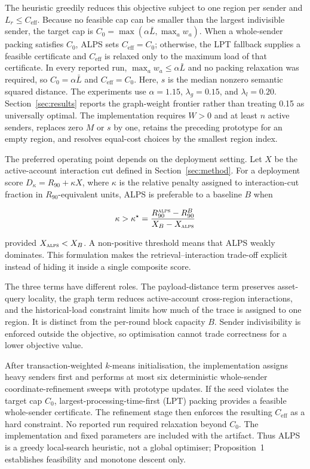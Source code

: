 \documentclass[runningheads]{llncs}
\begin{document}
The heuristic greedily reduces this objective subject to one region per sender and
$L_r\leq C_{\mathrm{eff}}$. Because no feasible cap can be smaller than the
largest indivisible sender, the target cap is
$C_0=\max(\alpha\bar L,\max_a w_a)$. When a whole-sender packing satisfies $C_0$, ALPS sets
$C_{\mathrm{eff}}=C_0$; otherwise, the LPT fallback supplies a feasible
certificate and $C_{\mathrm{eff}}$ is relaxed only to the maximum load of that
certificate. In every reported run, $\max_a w_a\leq\alpha\bar L$ and no
packing relaxation was required, so $C_0=\alpha\bar L$ and
$C_{\mathrm{eff}}=C_0$. Here, $s$ is the median
nonzero semantic squared distance. The experiments use $\alpha=1.15$,
$\lambda_g=0.15$, and $\lambda_l=0.20$. Section~\ref{sec:results} reports the
graph-weight frontier rather than treating 0.15 as universally optimal.
The implementation requires $W>0$ and at least $n$ active senders, replaces
zero $M$ or $s$ by one, retains the preceding prototype for an empty region,
and resolves equal-cost choices by the smallest region index.

The preferred operating point depends on the deployment setting. Let $X$ be
the active-account interaction cut defined in Section~\ref{sec:method}. For a
deployment score $D_\kappa=R_{90}+\kappa X$, where $\kappa$ is the relative
penalty assigned to interaction-cut fraction in $R_{90}$-equivalent units,
ALPS is preferable to a baseline $B$ when

\begin{equation}
\label{eq:deployment}
\kappa > \kappa^\star=
\frac{R_{90}^{\textsc{alps}}-R_{90}^{B}}{X_B-X_{\textsc{alps}}}
\end{equation}

provided $X_{\textsc{alps}}<X_B$. A non-positive threshold means that ALPS
weakly dominates. This formulation makes the retrieval--interaction trade-off
explicit instead of hiding it inside a single composite score.

The three terms have different roles. The payload-distance term preserves
asset-query locality, the graph term reduces active-account cross-region
interactions, and the historical-load constraint limits how much of the trace
is assigned to one region. It is distinct from the per-round block capacity
$B$. Sender indivisibility is enforced outside the objective,
so optimisation cannot trade correctness for a lower objective value.

After transaction-weighted $k$-means initialisation, the implementation assigns
heavy senders first and performs at most six deterministic whole-sender
coordinate-refinement sweeps with prototype updates. If the seed violates
the target cap $C_0$, largest-processing-time-first (LPT) packing provides a
feasible whole-sender certificate. The refinement stage then enforces the
resulting $C_{\mathrm{eff}}$ as a hard constraint. No reported run required
relaxation beyond $C_0$. The implementation and fixed parameters are included
with the artifact.
Thus ALPS is a greedy local-search heuristic, not a global optimiser;
Proposition~1 establishes feasibility and monotone descent only.
\end{document}
